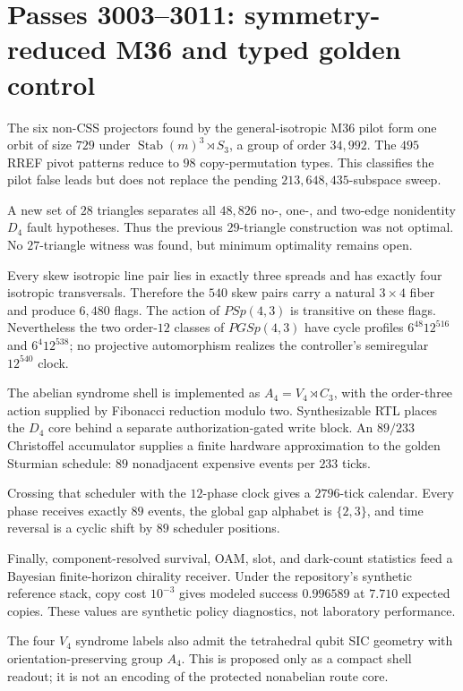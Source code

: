 \section{Passes 3003--3011: symmetry-reduced M36 and typed golden control}

The six non-CSS projectors found by the general-isotropic M36 pilot form one orbit of size $729$ under $\operatorname{Stab}(m)^3\rtimes S_3$, a group of order $34{,}992$. The $495$ RREF pivot patterns reduce to $98$ copy-permutation types. This classifies the pilot false leads but does not replace the pending $213{,}648{,}435$-subspace sweep.

A new set of $28$ triangles separates all $48{,}826$ no-, one-, and two-edge nonidentity $D_4$ fault hypotheses. Thus the previous $29$-triangle construction was not optimal. No $27$-triangle witness was found, but minimum optimality remains open.

Every skew isotropic line pair lies in exactly three spreads and has exactly four isotropic transversals. Therefore the $540$ skew pairs carry a natural $3\times4$ fiber and produce $6{,}480$ flags. The action of $PSp(4,3)$ is transitive on these flags. Nevertheless the two order-$12$ classes of $PGSp(4,3)$ have cycle profiles $6^{48}12^{516}$ and $6^4 12^{538}$; no projective automorphism realizes the controller's semiregular $12^{540}$ clock.

The abelian syndrome shell is implemented as $A_4=V_4\rtimes C_3$, with the order-three action supplied by Fibonacci reduction modulo two. Synthesizable RTL places the $D_4$ core behind a separate authorization-gated write block. An $89/233$ Christoffel accumulator supplies a finite hardware approximation to the golden Sturmian schedule: $89$ nonadjacent expensive events per $233$ ticks.

Crossing that scheduler with the $12$-phase clock gives a $2796$-tick calendar. Every phase receives exactly $89$ events, the global gap alphabet is $\{2,3\}$, and time reversal is a cyclic shift by $89$ scheduler positions.

Finally, component-resolved survival, OAM, slot, and dark-count statistics feed a Bayesian finite-horizon chirality receiver. Under the repository's synthetic reference stack, copy cost $10^{-3}$ gives modeled success $0.996589$ at $7.710$ expected copies. These values are synthetic policy diagnostics, not laboratory performance.

The four $V_4$ syndrome labels also admit the tetrahedral qubit SIC geometry with orientation-preserving group $A_4$. This is proposed only as a compact shell readout; it is not an encoding of the protected nonabelian route core.

